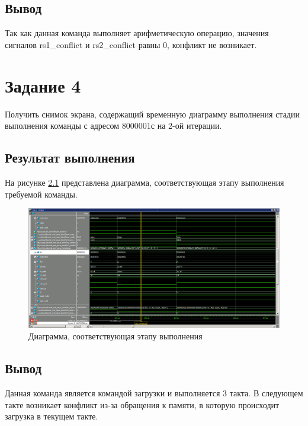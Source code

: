 \section{Вывод}

Так как данная команда выполняет арифметическую операцию, значения сигналов rs1\_conflict и rs2\_conflict равны 0, конфликт не возникает.

\chapter{Задание 4}

Получить снимок экрана, содержащий временную диаграмму выполнения стадии выполнения команды с адресом 8000001с на 2-ой итерации.

\section{Результат выполнения}

На рисунке \ref{img:801C} представлена диаграмма, соответствующая этапу выполнения требуемой команды.

\begin{figure}[H]
	\begin{center}
		\includegraphics[scale=0.3]{img/801C.png}
	\end{center}
	\captionsetup{justification=centering}
	\caption{Диаграмма, соответствующая этапу выполнения}
	\label{img:801C}
\end{figure}

\section{Вывод}

Данная команда является командой загрузки и выполняется 3 такта. В следующем такте возникает конфликт из-за обращения к памяти, в которую происходит загрузка в текущем такте.

